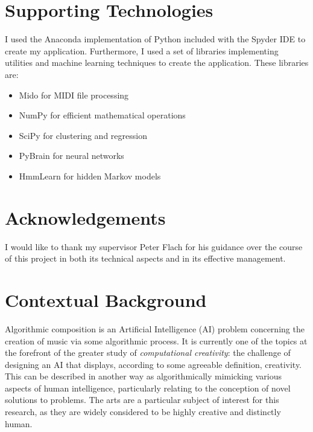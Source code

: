 \documentclass[ author={Stephen Livermore-Tozer},
				supervisor={Dr. Peter Flach},
				degree={MEng},
				title={Algorithmic Co-composition Using Machine Learning},
				subtitle={},
				type={research},
				year={2016} ]{dissertation}
\begin{document}
	\chapter*{Supporting Technologies}
	
	I used the Anaconda implementation of Python included with the Spyder IDE to create my application. Furthermore, I used a set of libraries implementing utilities and machine learning techniques to create the application. These libraries are: 
	
	\begin{itemize}
		\item Mido for MIDI file processing
		\item NumPy for efficient mathematical operations
		\item SciPy for clustering and regression
		\item PyBrain for neural networks
		\item HmmLearn for hidden Markov models
	\end{itemize}
	
	
	\chapter*{Acknowledgements}
	
	I would like to thank my supervisor Peter Flach for his guidance over the course of this project in both its technical aspects and in its effective management.
	
	\mainmatter
	
	
	\chapter{Contextual Background}
	\label{chap:context}
	
	Algorithmic composition is an Artificial Intelligence (AI) problem concerning the creation of music via some algorithmic process. It is currently one of the topics at the forefront of the greater study of \textit{computational creativity}: the challenge of designing an AI that displays, according to some agreeable definition, creativity. This can be described in another way as algorithmically mimicking various aspects of human intelligence, particularly relating to the conception of novel solutions to problems. The arts are a particular subject of interest for this research, as they are widely considered to be highly creative and distinctly human.
	
\end{document}
